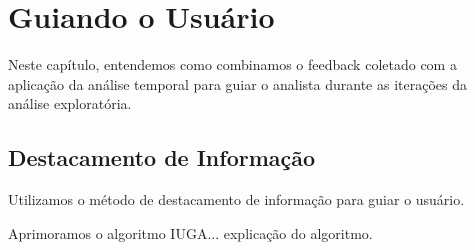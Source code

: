 \chapter{Guiando o Usuário}
\label{chap:guiando}

Neste capítulo, entendemos como combinamos o feedback coletado com a aplicação da análise temporal para guiar o analista durante as iterações da análise exploratória.

\section{Destacamento de Informação}

Utilizamos o método de destacamento de informação para guiar o usuário.

Aprimoramos o algoritmo IUGA... explicação do algoritmo.